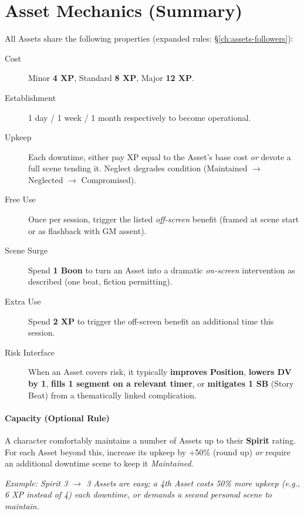 \section{Asset Mechanics (Summary)}
All Assets share the following properties (expanded rules: \S\ref{ch:assets-followers}):
\begin{description}
  \item[Cost] Minor \textbf{4 XP}, Standard \textbf{8 XP}, Major \textbf{12 XP}. 
  \item[Establishment] 1 day / 1 week / 1 month respectively to become operational.
  \item[Upkeep] Each downtime, either pay XP equal to the Asset's base cost \emph{or} devote a full scene tending it. Neglect degrades condition (Maintained $\rightarrow$ Neglected $\rightarrow$ Compromised). 
  \item[Free Use] Once per session, trigger the listed \emph{off-screen} benefit (framed at scene start or as flashback with GM assent).
  \item[Scene Surge] Spend \textbf{1 Boon} to turn an Asset into a dramatic \emph{on-screen} intervention as described (one beat, fiction permitting). 
  \item[Extra Use] Spend \textbf{2 XP} to trigger the off-screen benefit an additional time this session.
  \item[Risk Interface] When an Asset covers risk, it typically \textbf{improves Position}, \textbf{lowers DV by 1}, \textbf{fills 1 segment on a relevant timer}, or \textbf{mitigates 1 SB} (Story Beat) from a thematically linked complication. 
\end{description}

\paragraph{Capacity (Optional Rule)}
A character comfortably maintains a number of Assets up to their \textbf{Spirit} rating. For each Asset beyond this, increase its upkeep by +50\% (round up) \emph{or} require an additional downtime scene to keep it \emph{Maintained}.

\emph{Example: Spirit 3 $\rightarrow$ 3 Assets are easy; a 4th Asset costs 50\% more upkeep (e.g., 6 XP instead of 4) each downtime, or demands a second personal scene to maintain.}

